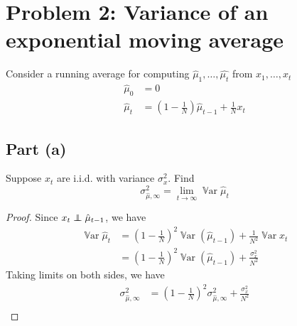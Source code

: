 \documentclass{amsart}
\newcommand\ind{\protect\mathpalette{\protect\independenT}{\perp}}
\def\independenT#1#2{\mathrel{\rlap{$#1#2$}\mkern2mu{#1#2}}}
\DeclareMathOperator{\Var}{\mathbb{V}ar}  %
\theoremstyle{definition}
\begin{document}
\section*{Problem 2: Variance of an exponential moving average}
Consider a running average for computing $\hat{\mu}_1, \ldots, \hat{\mu_t}$ from $x_1, \ldots, x_t$
\begin{align*}
    \hat{\mu}_0 &= 0\\
    \hat{\mu}_t &= \left(
    1 - \frac1{N} 
    \right) \hat{\mu}_{t - 1} + \frac1{N} x_t
\end{align*}
\subsection*{Part (a)} Suppose $x_t$ are i.i.d. with variance $\sigma_x^2$. 
Find 
\[
\sigma_{\hat{\mu}, \infty}^2 = \lim_{t\to\infty} \Var{\hat{\mu}_t}
\]
\begin{proof}
    Since $x_t \ind \hat{\mu}_{t - 1}$, we have
    \begin{align*}
        \Var{\hat{\mu}_t} &= \left(
            1 - \frac1{N}
        \right)^2\Var{ (\hat{\mu}_{t - 1})} + \frac1{N^2} \Var{x_t} \\
        &= \left(1 - \frac1{N}\right)^2 \Var{(\hat{\mu}_{t - 1})} + \frac{\sigma_x^2}{N^2}
    \end{align*}
    Taking limits on both sides, we have
    \begin{align*}
        \sigma_{\hat{\mu}, \infty}^2 &= \left(1 - \frac1{N}\right)^2 \sigma_{\hat{\mu}, \infty}^2 + \frac{\sigma_x^2}{N^2}\\
        
    \end{align*}
\end{proof}
\end{document}
